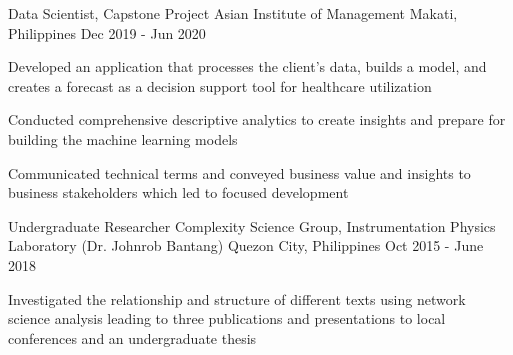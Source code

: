 

\begin{cventries}

  \cventry
    {Data Scientist, Capstone Project} %
    {Asian Institute of Management} %
    {Makati, Philippines} %
    {Dec 2019 - Jun 2020} %
    {
      \begin{cvitems} %
        \item {Developed an application that processes the client's data, builds a model, and creates a forecast as a decision support tool for healthcare utilization}
        \item {Conducted comprehensive descriptive analytics to create insights and prepare for building the machine learning models}
        \item {Communicated technical terms and conveyed business value and insights to business stakeholders which led to focused development}
      \end{cvitems}
    }

  \cventry
    {Undergraduate Researcher} %
    {Complexity Science Group, Instrumentation Physics Laboratory (Dr. Johnrob Bantang)} %
    {Quezon City, Philippines} %
    {Oct 2015 - June 2018} %
    {
      \begin{cvitems} %
        \item {Investigated the relationship and structure of different texts using network science analysis leading to three publications and presentations to local conferences and an undergraduate thesis}
      \end{cvitems}
    }


\end{cventries}
